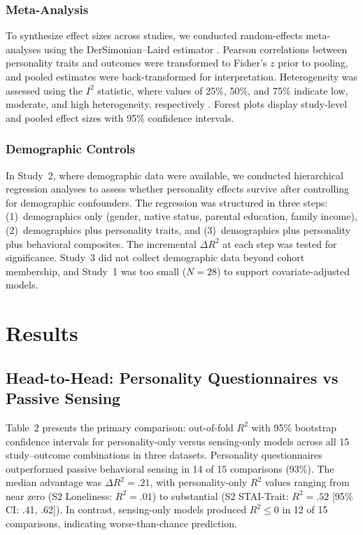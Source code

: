 \documentclass[12pt, a4paper]{article}
\begin{document}
\subsubsection{Meta-Analysis}

To synthesize effect sizes across studies, we conducted random-effects meta-analyses using the DerSimonian--Laird estimator \citep{dersimonian1986meta}. Pearson correlations between personality traits and outcomes were transformed to Fisher's $z$ prior to pooling, and pooled estimates were back-transformed for interpretation. Heterogeneity was assessed using the $I^2$ statistic, where values of 25\%, 50\%, and 75\% indicate low, moderate, and high heterogeneity, respectively \citep{cohen1988statistical}. Forest plots display study-level and pooled effect sizes with 95\% confidence intervals.

\subsubsection{Demographic Controls}

In Study~2, where demographic data were available, we conducted hierarchical regression analyses to assess whether personality effects survive after controlling for demographic confounders. The regression was structured in three steps: (1)~demographics only (gender, native status, parental education, family income), (2)~demographics plus personality traits, and (3)~demographics plus personality plus behavioral composites. The incremental $\Delta R^2$ at each step was tested for significance. Study~3 did not collect demographic data beyond cohort membership, and Study~1 was too small ($N = 28$) to support covariate-adjusted models.

\section{Results}

\subsection{Head-to-Head: Personality Questionnaires vs Passive Sensing}

Table~2 presents the primary comparison: out-of-fold $R^2$ with 95\% bootstrap confidence intervals for personality-only versus sensing-only models across all 15 study--outcome combinations in three datasets. Personality questionnaires outperformed passive behavioral sensing in 14 of 15 comparisons (93\%). The median advantage was $\Delta R^2 = .21$, with personality-only $R^2$ values ranging from near zero (S2 Loneliness: $R^2 = .01$) to substantial (S2 STAI-Trait: $R^2 = .52$ [95\% CI: .41, .62]). In contrast, sensing-only models produced $R^2 \leq 0$ in 12 of 15 comparisons, indicating worse-than-chance prediction.
\end{document}
